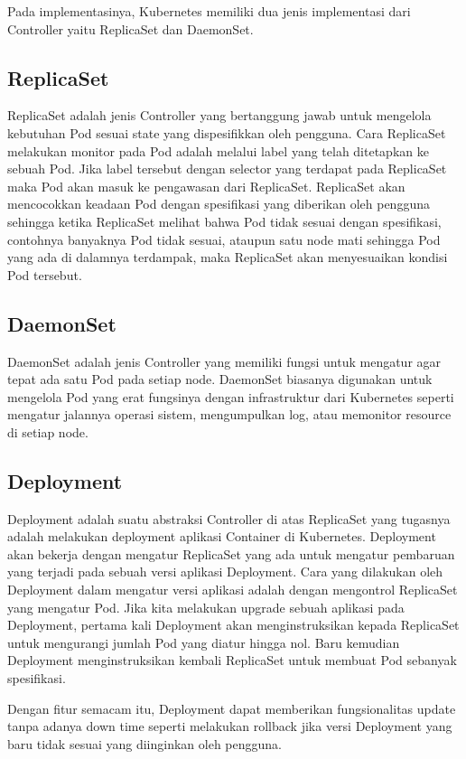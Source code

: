 Pada implementasinya, Kubernetes memiliki dua jenis implementasi dari Controller yaitu ReplicaSet dan DaemonSet.

\subsection{ReplicaSet}
ReplicaSet adalah jenis Controller yang bertanggung jawab untuk mengelola kebutuhan Pod sesuai state yang dispesifikkan oleh pengguna.
Cara ReplicaSet melakukan monitor pada Pod adalah melalui label yang telah ditetapkan ke sebuah Pod.
Jika label tersebut dengan selector yang terdapat pada ReplicaSet maka Pod akan masuk ke pengawasan dari ReplicaSet.
ReplicaSet akan mencocokkan keadaan Pod dengan spesifikasi yang diberikan oleh pengguna sehingga ketika ReplicaSet melihat bahwa Pod tidak sesuai dengan spesifikasi, contohnya banyaknya Pod tidak sesuai, ataupun satu node mati sehingga Pod yang ada di dalamnya terdampak, maka ReplicaSet akan menyesuaikan kondisi Pod tersebut.

\subsection{DaemonSet}
DaemonSet adalah jenis Controller yang memiliki fungsi untuk mengatur agar tepat ada satu Pod pada setiap node.
DaemonSet biasanya digunakan untuk mengelola Pod yang erat fungsinya dengan infrastruktur dari Kubernetes seperti mengatur jalannya operasi sistem, mengumpulkan log, atau memonitor resource di setiap node.

\subsection{Deployment}
Deployment adalah suatu abstraksi Controller di atas ReplicaSet yang tugasnya adalah melakukan deployment aplikasi Container di Kubernetes.
Deployment akan bekerja dengan mengatur ReplicaSet yang ada untuk mengatur pembaruan yang terjadi pada sebuah versi aplikasi Deployment.
Cara yang dilakukan oleh Deployment dalam mengatur versi aplikasi adalah dengan mengontrol ReplicaSet yang mengatur Pod.
Jika kita melakukan upgrade sebuah aplikasi pada Deployment, pertama kali Deployment akan menginstruksikan kepada ReplicaSet untuk mengurangi jumlah Pod yang diatur hingga nol.
Baru kemudian Deployment menginstruksikan kembali ReplicaSet untuk membuat Pod sebanyak spesifikasi.

Dengan fitur semacam itu, Deployment dapat memberikan fungsionalitas update tanpa adanya down time seperti melakukan rollback jika versi Deployment yang baru tidak sesuai yang diinginkan oleh pengguna.

